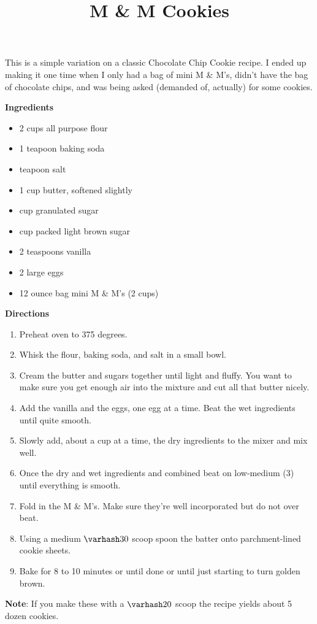 \documentclass{article}
\title{M \& M  Cookies}
\begin{document}
This is a simple variation on a classic Chocolate Chip Cookie recipe. I ended up making it one
time when I only had a bag of mini M \& M's, didn't have the bag of chocolate chips, and was being
asked (demanded of, actually) for some cookies.

\textbf{Ingredients}

\begin{multicols}{2}

      \begin{itemize}
            \item 2 cups all purpose flour
            \item 1 teapoon baking soda
            \item {} teapoon salt

            \item 1 cup butter, softened slightly
            \item {} cup granulated sugar
            \item {} cup packed light brown sugar

            \item 2 teaspoons vanilla
            \item 2 large eggs
            \item 12 ounce bag mini M \& M's (2 cups)
      \end{itemize}
\end{multicols}

\textbf{Directions}

\begin{enumerate}
      \item Preheat oven to 375 degrees.
      \item Whisk the flour, baking soda, and salt in a small bowl.
      \item Cream the butter and sugars together until light and fluffy. You want to make sure you get
            enough air into the mixture and cut all that butter nicely.
      \item Add the vanilla and the eggs, one egg at a time. Beat the wet ingredients until quite smooth.
      \item Slowly add, about a cup at a time, the dry ingredients to the mixer and mix well.
      \item Once the dry and wet ingredients and combined beat on low-medium (3) until
            everything is smooth.
      \item Fold in the M \& M's. Make sure they're well incorporated but do not over beat.
      \item Using a medium $\varhash 30$ scoop spoon the batter onto parchment-lined cookie sheets.
      \item Bake for 8 to 10 minutes or until done or until just starting to turn golden brown.
\end{enumerate}

\medskip

\textbf{Note}: If you make these with a $\varhash 20$ scoop the recipe yields about 5 dozen cookies.

\end{document}
